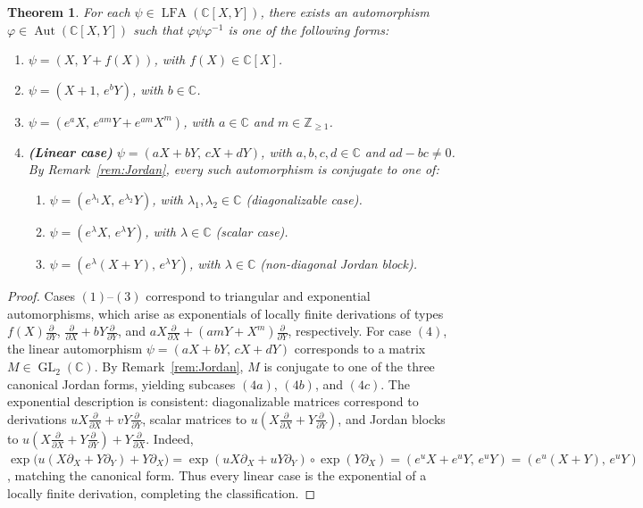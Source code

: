 \documentclass[11pt,a4paper,reqno]{amsart}
\newtheorem{theorem}{Theorem}[section]
\begin{document}
 
\begin{theorem}
For each $\psi \in \operatorname{LFA}(\mathbb{C}[X,Y])$, there exists an automorphism 
$\varphi \in \operatorname{Aut}(\mathbb{C}[X,Y])$ such that $\varphi\psi\varphi^{-1}$ is one of the following forms:
\begin{enumerate}
    \item $\psi=(X,\,Y+f(X))$, with $f(X)\in \mathbb{C}[X]$.
    \item $\psi=(X+1,\,e^bY)$, with $b\in \mathbb{C}$.
    \item $\psi=(e^aX,\, e^{am}Y+e^{am}X^m)$, with $a\in \mathbb{C}$ and $m\in \mathbb{Z}_{\geq 1}$.
    \item \textbf{(Linear case)} $\psi=(aX+bY,\,cX+dY)$, with $a,b,c,d\in \mathbb{C}$ and $ad-bc\neq 0$.  
    By Remark~\ref{rem:Jordan}, every such automorphism is conjugate to one of:
    \begin{enumerate}
        \item $\psi=(e^{\lambda_1}X,\, e^{\lambda_2}Y)$, with $\lambda_1,\lambda_2 \in \mathbb{C}$ (diagonalizable case).  
        \item $\psi=(e^{\lambda}X,\, e^{\lambda}Y)$, with $\lambda\in \mathbb{C}$ (scalar case).  
        \item $\psi=(e^{\lambda}(X+Y),\, e^{\lambda}Y)$, with $\lambda\in \mathbb{C}$ (non-diagonal Jordan block).
    \end{enumerate}
\end{enumerate}
\end{theorem}
 
\begin{proof}
Cases $(1)$--$(3)$ correspond to triangular and exponential automorphisms, which arise as exponentials of locally finite derivations of types $f(X)\tfrac{\partial}{\partial Y}$, $\tfrac{\partial}{\partial X}+bY\tfrac{\partial}{\partial Y}$, and $aX\tfrac{\partial}{\partial X}+(amY+X^m)\tfrac{\partial}{\partial Y}$, respectively. 
For case $(4)$, the linear automorphism $\psi=(aX+bY,\,cX+dY)$ corresponds to a matrix $M\in \operatorname{GL}_2(\mathbb{C})$.  
By Remark~\ref{rem:Jordan}, $M$ is conjugate to one of the three canonical Jordan forms, yielding subcases $(4a)$, $(4b)$, and $(4c)$.
The exponential description is consistent: diagonalizable matrices correspond to derivations $uX\tfrac{\partial}{\partial X}+vY\tfrac{\partial}{\partial Y}$, scalar matrices to $u(X\tfrac{\partial}{\partial X}+Y\tfrac{\partial}{\partial Y})$, and Jordan blocks to $u(X\tfrac{\partial}{\partial X}+Y\tfrac{\partial}{\partial Y})+Y\tfrac{\partial}{\partial X}$. Indeed, $\exp\!\big(u(X\partial_X+Y\partial_Y)+Y\partial_X\big)=\exp(uX\partial_X+uY\partial_Y)\circ\exp(Y\partial_X)=(e^u X + e^u Y,\, e^u Y)=(e^u(X+Y),\,e^uY)$, matching the canonical form.
Thus every linear case is the exponential of a locally finite derivation, completing the classification.
\end{proof}
 
\end{document}
